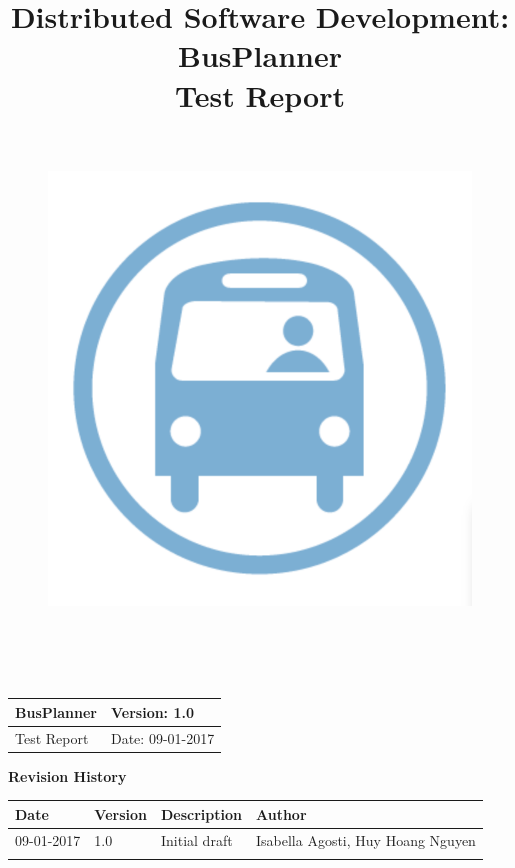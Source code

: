 \documentclass[a4paper, 12pt]{article}
\title{
	\textbf{D}istributed \textbf{S}oftware \textbf{D}evelopment: \textbf{BusPlanner}\\
	\textbf{Test Report}\\
	\begin{figure}[H]
		\centering
		\includegraphics[width=13cm, height=13cm]{Bus_logo}
	\end{figure}
	\date{}
}
\begin{document}
	\begin{table}[t]
		\centering
		\begin{tabular}{| m{6cm} | m{6cm} |}
			\hline
			BusPlanner & Version: 1.0\\
			\hline
			Test Report & Date: 09-01-2017\\
			\hline
		\end{tabular}
	\end{table}
	\maketitle 
	\begin{center}
		\textbf{\Large Revision History}
	\end{center}
	\begin{table}[h]
		\centering
		\begin{tabular}{| m{2cm} | m{2cm} | m{3cm} | m{5cm} |}
			\hline
			\textbf{Date} & \textbf{Version} & \textbf{Description} & \textbf{Author}\\
			\hline
			09-01-2017 & 1.0 & Initial draft & Isabella Agosti, Huy Hoang Nguyen\\
			\hline
			& & & \\
			\hline
		\end{tabular}
	\end{table}
\newpage
	\tableofcontents
	
	
\end{document}
